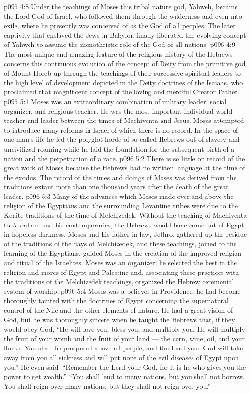 \vs p096 4:8 Under the teachings of Moses this tribal nature god, Yahweh, became the Lord God of Israel, who followed them through the wilderness and even into exile, where he presently was conceived of as the God of all peoples. The later captivity that enslaved the Jews in Babylon finally liberated the evolving concept of Yahweh to assume the monotheistic role of the God of all nations.
\vs p096 4:9 The most unique and amazing feature of the religious history of the Hebrews concerns this continuous evolution of the concept of Deity from the primitive god of Mount Horeb up through the teachings of their successive spiritual leaders to the high level of development depicted in the Deity doctrines of the Isaiahs, who proclaimed that magnificent concept of the loving and merciful Creator Father.
\vs p096 5:1 Moses was an extraordinary combination of military leader, social organizer, and religious teacher. He was the most important individual world teacher and leader between the times of Machiventa and Jesus. Moses attempted to introduce many reforms in Israel of which there is no record. In the space of one man’s life he led the polyglot horde of so\hyp{}called Hebrews out of slavery and uncivilized roaming while he laid the foundation for the subsequent birth of a nation and the perpetuation of a race.
\vs p096 5:2 There is so little on record of the great work of Moses because the Hebrews had no written language at the time of the exodus. The record of the times and doings of Moses was derived from the traditions extant more than one thousand years after the death of the great leader.
\vs p096 5:3 Many of the advances which Moses made over and above the religion of the Egyptians and the surrounding Levantine tribes were due to the Kenite traditions of the time of Melchizedek. Without the teaching of Machiventa to Abraham and his contemporaries, the Hebrews would have come out of Egypt in hopeless darkness. Moses and his father\hyp{}in\hyp{}law, Jethro, gathered up the residue of the traditions of the days of Melchizedek, and these teachings, joined to the learning of the Egyptians, guided Moses in the creation of the improved religion and ritual of the Israelites. Moses was an organizer; he selected the best in the religion and mores of Egypt and Palestine and, associating these practices with the traditions of the Melchizedek teachings, organized the Hebrew ceremonial system of worship.
\vs p096 5:4 \pc Moses was a believer in Providence; he had become thoroughly tainted with the doctrines of Egypt concerning the supernatural control of the Nile and the other elements of nature. He had a great vision of God, but he was thoroughly sincere when he taught the Hebrews that, if they would obey God, “He will love you, bless you, and multiply you. He will multiply the fruit of your womb and the fruit of your land --- the corn, wine, oil, and your flocks. You shall be prospered above all people, and the Lord your God will take away from you all sickness and will put none of the evil diseases of Egypt upon you.” He even said: “Remember the Lord your God, for it is he who gives you the power to get wealth.” “You shall lend to many nations, but you shall not borrow. You shall reign over many nations, but they shall not reign over you.”
